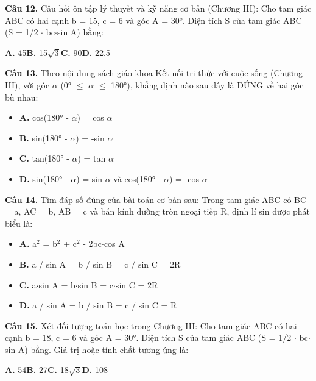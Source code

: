 \documentclass[11pt,a4paper]{article}
\begin{document}
\textbf{\color{primary} Câu 12.} Câu hỏi ôn tập lý thuyết và kỹ năng cơ bản (Chương III): Cho tam giác ABC có hai cạnh b = 15, c = 6 và góc A = 30°. Diện tích S của tam giác ABC (S = 1/2 $\cdot$ bc$\cdot$sin A) bằng:\par
\hspace*{1.5em}\textbf{A.} 45\quad\quad \textbf{B.} 15$\sqrt{3}$\quad\quad \textbf{C.} 90\quad\quad \textbf{D.} 22.5\par\vspace{2pt}
\textbf{\color{primary} Câu 13.} Theo nội dung sách giáo khoa Kết nối tri thức với cuộc sống (Chương III), với góc $\alpha$ (0° $\le$ $\alpha$ $\le$ 180°), khẳng định nào sau đây là ĐÚNG về hai góc bù nhau:\par
\begin{itemize}\setlength{\itemsep}{1pt}\setlength{\parskip}{0pt}
  \item[] \textbf{A.} cos(180° - $\alpha$) = cos $\alpha$
  \item[] \textbf{B.} sin(180° - $\alpha$) = -sin $\alpha$
  \item[] \textbf{C.} tan(180° - $\alpha$) = tan $\alpha$
  \item[] \textbf{D.} sin(180° - $\alpha$) = sin $\alpha$ và cos(180° - $\alpha$) = -cos $\alpha$
\end{itemize}\vspace{2pt}
\textbf{\color{primary} Câu 14.} Tìm đáp số đúng của bài toán cơ bản sau: Trong tam giác ABC có BC = a, AC = b, AB = c và bán kính đường tròn ngoại tiếp R, định lí sin được phát biểu là:\par
\begin{itemize}\setlength{\itemsep}{1pt}\setlength{\parskip}{0pt}
  \item[] \textbf{A.} a$^2$ = b$^2$ + c$^2$ - 2bc$\cdot$cos A
  \item[] \textbf{B.} a / sin A = b / sin B = c / sin C = 2R
  \item[] \textbf{C.} a$\cdot$sin A = b$\cdot$sin B = c$\cdot$sin C = 2R
  \item[] \textbf{D.} a / sin A = b / sin B = c / sin C = R
\end{itemize}\vspace{2pt}
\textbf{\color{primary} Câu 15.} Xét đối tượng toán học trong Chương III: Cho tam giác ABC có hai cạnh b = 18, c = 6 và góc A = 30°. Diện tích S của tam giác ABC (S = 1/2 $\cdot$ bc$\cdot$sin A) bằng. Giá trị hoặc tính chất tương ứng là:\par
\hspace*{1.5em}\textbf{A.} 54\quad\quad \textbf{B.} 27\quad\quad \textbf{C.} 18$\sqrt{3}$\quad\quad \textbf{D.} 108\par\vspace{2pt}
\end{document}

